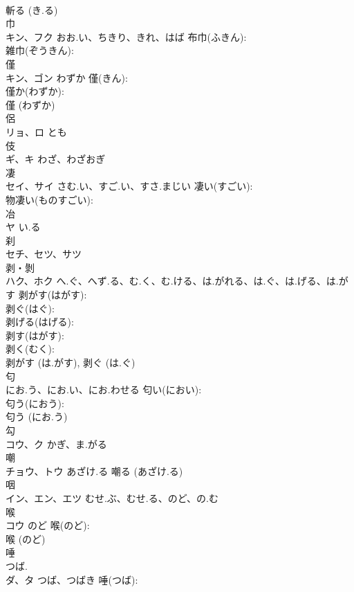 \documentclass[8pt]{extreport}
\begin{document}
\begin{CJK}{UTF8}{min}
\\	斬る (き.る)
\\	巾			
\\	キン、フク	おお.い、ちきり、きれ、はば	布巾(ふきん): 
\\	雑巾(ぞうきん): 
\\	僅			
\\	キン、ゴン	わずか	僅(きん): 
\\	僅か(わずか): 
\\	僅 (わずか)
\\	侶			
\\	リョ、ロ	とも		
\\	伎			
\\	ギ、キ	わざ、わざおぎ		
\\	凄			
\\	セイ、サイ	さむ.い、すご.い、すさ.まじい	凄い(すごい): 
\\	物凄い(ものすごい): 
\\	冶			
\\	ヤ	い.る		
\\	刹			
\\	セチ、セツ、サツ			
\\	剥・剝			
\\	ハク、ホク	へ.ぐ、へず.る、む.く、む.ける、は.がれる、は.ぐ、は.げる、は.がす	剥がす(はがす): 
\\	剥ぐ(はぐ): 
\\	剥げる(はげる): 
\\	剥す(はがす): 
\\	剥く(むく): 
\\	剥がす (は.がす), 剥ぐ (は.ぐ)
\\	匂			
\\	にお.う、にお.い、にお.わせる	匂い(におい): 
\\	匂う(におう): 
\\	匂う (にお.う)
\\	勾			
\\	コウ、ク	かぎ、ま.がる		
\\	嘲			
\\	チョウ、トウ	あざけ.る		嘲る (あざけ.る)
\\	咽			
\\	イン、エン、エツ	むせ.ぶ、むせ.る、のど、の.む		
\\	喉			
\\	コウ	のど	喉(のど): 
\\	喉 (のど)
\\	唾			
\\	つば.	
\\	ダ、タ	つば、つばき	唾(つば): 

\end{CJK}
\end{document}
